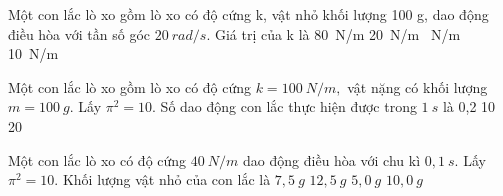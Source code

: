 \begin{vidu} %
 Một con lắc lò xo gồm lò xo có độ cứng k, vật nhỏ khối lượng 100 g, dao động điều hòa với tần số góc $20\ rad/s$. Giá trị của k là
\choice
{80\ N/m}
{20\ N/m}
{\ N/m}
{10\ N/m}
\end{vidu} %
\begin{vidu} %
Một con lắc lò xo gồm lò xo có độ cứng $k=100\ N/m,$ vật nặng có khối lượng $m=100\ g$. Lấy $\pi ^2=10.$ Số dao động con lắc thực hiện được trong $1\ s$ là
\choice
{0,2}
{}
{10}
{20}
\end{vidu} %
\begin{vidu}%
Một con lắc lò xo có độ cứng $40\ N/m$ dao động điều hòa với chu kì $0,1\ s.$ Lấy $ \pi ^2 = 10.$ Khối lượng vật nhỏ của con lắc là
\choice
{$7,5\ g$}
{$12,5\ g$}
{$5,0\ g$}
{\True $10,0\ g$}
\end{vidu} %

